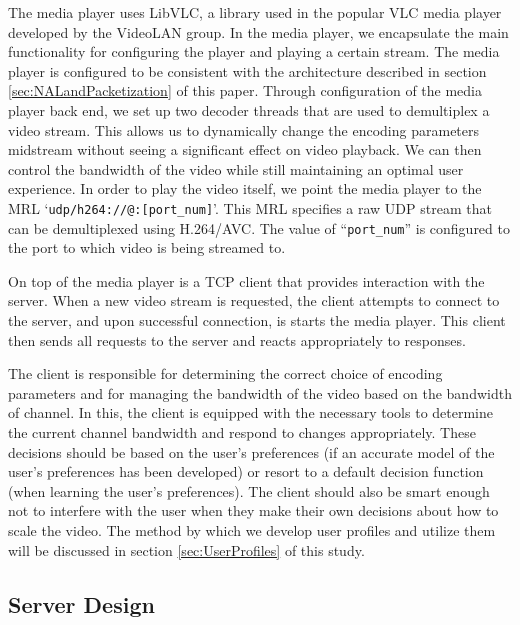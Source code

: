 \documentclass[a4paper,12pt]{article}
\begin{document}
The media player uses LibVLC, a library used in the popular VLC media player developed by the VideoLAN group. In the media player, we encapsulate the main functionality for configuring the player and playing a certain stream.  The media player is configured to be consistent with the architecture described in section \ref{sec:NALandPacketization} of this paper. Through configuration of the media player back end, we set up two decoder threads that are used to demultiplex a video stream. This allows us to dynamically change the encoding parameters midstream without seeing a significant effect on video playback. We can then control the bandwidth of the video while still maintaining an optimal user experience. In order to play the video itself, we point the media player to the MRL `\verb=udp/h264://@:[port_num]='. This MRL specifies a raw UDP stream that can be demultiplexed using H.264/AVC. The value of ``\verb=port_num=''  is configured to the port to which video is being streamed to.

On top of the media player is a TCP client that provides interaction with the server. When a new video stream is requested, the client attempts to connect to the server, and upon successful connection, is starts the media player. This client then sends all requests to the server and reacts appropriately to responses.

The client is responsible for determining the correct choice of encoding parameters and for managing the bandwidth of the video based on the bandwidth of channel. In this, the client is equipped with the necessary tools to determine the current channel bandwidth and respond to changes appropriately. These decisions should be based on the user's preferences (if an accurate model of the user’s preferences has been developed) or resort to a default decision function (when learning the user’s preferences). The client should also be smart enough not to interfere with the user when they make their own decisions about how to scale the video. The method by which we develop user profiles and utilize them will be discussed in section \ref{sec:UserProfiles} of this study.

\subsection{Server Design}
\end{document}
